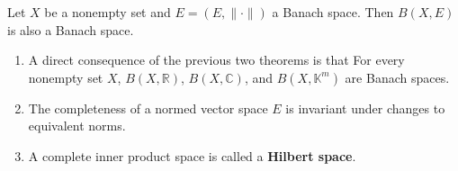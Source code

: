 \begin{theorem}
    Let \(X\) be a nonempty set and \(E = \left(E, \lVert \cdot \rVert\right)\)
    a Banach space. Then \(B\left(X, E\right)\) is also a Banach space. 
\end{theorem}

\begin{remark}
    \begin{enumerate}[label=(\alph*)]
        \item A direct consequence of the previous two theorems is that For every 
        nonempty set \(X\), \(B\left(X, \mathbb{R}\right)\), \(B\left(X, \mathbb{C}\right)\),
        and \(B\left(X, \mathbb{K}^m\right)\) are Banach spaces.
        \item The completeness of a normed vector space \(E\) is invariant under changes
        to equivalent norms. 
        \item A complete inner product space is called a \textbf{Hilbert space}. 
    \end{enumerate}
\end{remark}

